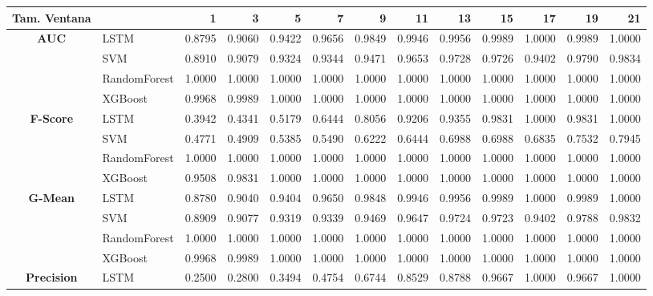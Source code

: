 \begin{table}[h]
	\centering
	\begin{adjustbox}{max width=15cm}
		\begin{tabular}{|c|l|r|r|r|r|r|r|r|r|r|r|r|}
			\hline
			\textbf{Tam. Ventana} &         &      1  &      3  &      5  &      7  &      9  &      11 &      13 &      15 &      17 &      19 &      21 \\
			\hline
			\textbf{AUC} & LSTM &  0.8795 &  0.9060 &  0.9422 &  0.9656 &  0.9849 &  0.9946 &  0.9956 &  0.9989 &  1.0000 &  0.9989 &  1.0000 \\
			& SVM &  0.8910 &  0.9079 &  0.9324 &  0.9344 &  0.9471 &  0.9653 &  0.9728 &  0.9726 &  0.9402 &  0.9790 &  0.9834 \\
			& RandomForest &  1.0000 &  1.0000 &  1.0000 &  1.0000 &  1.0000 &  1.0000 &  1.0000 &  1.0000 &  1.0000 &  1.0000 &  1.0000 \\
			& XGBoost &  0.9968 &  0.9989 &  1.0000 &  1.0000 &  1.0000 &  1.0000 &  1.0000 &  1.0000 &  1.0000 &  1.0000 &  1.0000 \\
			\hline
			\textbf{F-Score} & LSTM &  0.3942 &  0.4341 &  0.5179 &  0.6444 &  0.8056 &  0.9206 &  0.9355 &  0.9831 &  1.0000 &  0.9831 &  1.0000 \\
			& SVM &  0.4771 &  0.4909 &  0.5385 &  0.5490 &  0.6222 &  0.6444 &  0.6988 &  0.6988 &  0.6835 &  0.7532 &  0.7945 \\
			& RandomForest &  1.0000 &  1.0000 &  1.0000 &  1.0000 &  1.0000 &  1.0000 &  1.0000 &  1.0000 &  1.0000 &  1.0000 &  1.0000 \\
			& XGBoost &  0.9508 &  0.9831 &  1.0000 &  1.0000 &  1.0000 &  1.0000 &  1.0000 &  1.0000 &  1.0000 &  1.0000 &  1.0000 \\
			\hline
			\textbf{G-Mean} & LSTM &  0.8780 &  0.9040 &  0.9404 &  0.9650 &  0.9848 &  0.9946 &  0.9956 &  0.9989 &  1.0000 &  0.9989 &  1.0000 \\
			& SVM &  0.8909 &  0.9077 &  0.9319 &  0.9339 &  0.9469 &  0.9647 &  0.9724 &  0.9723 &  0.9402 &  0.9788 &  0.9832 \\
			& RandomForest &  1.0000 &  1.0000 &  1.0000 &  1.0000 &  1.0000 &  1.0000 &  1.0000 &  1.0000 &  1.0000 &  1.0000 &  1.0000 \\
			& XGBoost &  0.9968 &  0.9989 &  1.0000 &  1.0000 &  1.0000 &  1.0000 &  1.0000 &  1.0000 &  1.0000 &  1.0000 &  1.0000 \\
			\hline
			\textbf{Precision} & LSTM &  0.2500 &  0.2800 &  0.3494 &  0.4754 &  0.6744 &  0.8529 &  0.8788 &  0.9667 &  1.0000 &  0.9667 &  1.0000 \\

\end{tabular}
\end{adjustbox}
\end{table}
